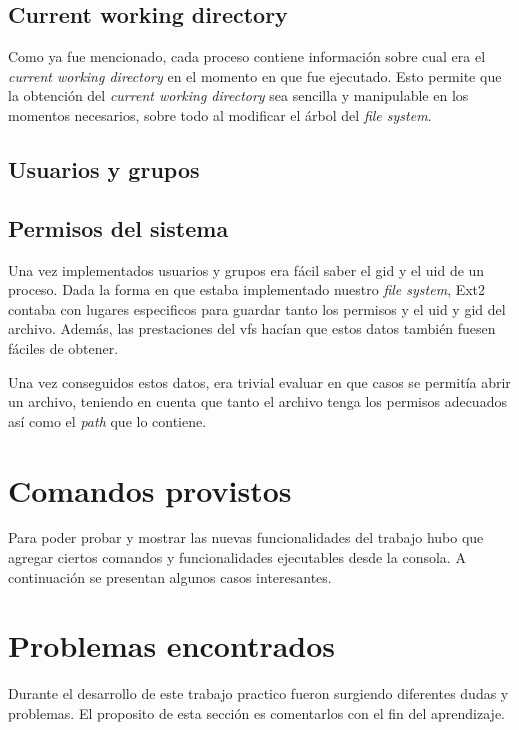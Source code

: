 \documentclass[a4paper,10pt]{article}
\begin{document}
    \subsection{Current working directory}
        
    Como ya fue mencionado, cada proceso contiene información sobre cual era el \textit{current working directory} en
    el momento en que fue ejecutado. Esto permite que la obtención del \textit{current working directory} sea sencilla
    y manipulable en los momentos necesarios, sobre todo al modificar el árbol del \textit{file system}.

    \subsection{Usuarios y grupos}

      
    
    \subsection{Permisos del sistema}

    Una vez implementados usuarios y grupos era fácil saber el gid y el uid de un proceso. Dada la forma en que estaba
    implementado nuestro \textit{file system}, Ext2 contaba con lugares especificos para guardar tanto los permisos y el
    uid y gid del archivo. Además, las prestaciones del vfs hacían que estos datos también fuesen fáciles de obtener.

    Una vez conseguidos estos datos, era trivial evaluar en que casos se permitía abrir un archivo, teniendo en cuenta
    que tanto el archivo tenga los permisos adecuados así como el \textit{path} que lo contiene.

\newpage
\section{Comandos provistos}
    Para poder probar y mostrar las nuevas funcionalidades del trabajo hubo que agregar ciertos comandos y
    funcionalidades ejecutables desde la consola. A continuación se presentan algunos casos interesantes.

\newpage
\section{Problemas encontrados}

Durante el desarrollo de este trabajo practico fueron surgiendo diferentes dudas y problemas. El proposito de esta
sección es comentarlos con el fin del aprendizaje.
\end{document}
